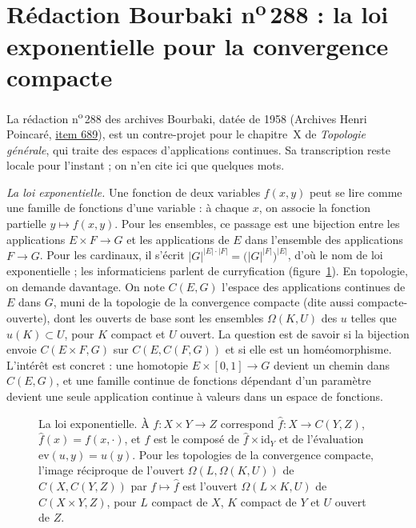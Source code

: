 \section[Rédaction Bourbaki n\textsuperscript{o}\,288 : la loi exponentielle]{Rédaction Bourbaki n\textsuperscript{o}\,288 : la loi exponentielle pour la convergence compacte\protect{}}\label{sec:bourbaki-288}

La rédaction n\textsuperscript{o}\,288 des archives Bourbaki, datée de 1958 (Archives Henri Poincaré, \href{https://archives-bourbaki.ahp-numerique.fr/items/show/689}{item 689}), est un contre-projet pour le chapitre~X de \emph{Topologie générale}, qui traite des espaces d'applications continues. Sa transcription reste locale pour l'instant ; on n'en cite ici que quelques mots.

\emph{La loi exponentielle.} Une fonction de deux variables $f(x, y)$ peut se lire comme une famille de fonctions d'une variable : à chaque $x$, on associe la fonction partielle $y \mapsto f(x, y)$. Pour les ensembles, ce passage est une bijection entre les applications $E \times F \to G$ et les applications de $E$ dans l'ensemble des applications $F \to G$. Pour les cardinaux, il s'écrit $|G|^{|E|\cdot|F|} = \bigl(|G|^{|F|}\bigr)^{|E|}$, d'où le nom de loi exponentielle ; les informaticiens parlent de curryfication (figure~\ref{fig:bourbaki-288}). En topologie, on demande davantage. On note $C(E, G)$ l'espace des applications continues de $E$ dans $G$, muni de la topologie de la convergence compacte (dite aussi compacte-ouverte), dont les ouverts de base sont les ensembles $\Omega(K, U)$ des $u$ telles que $u(K) \subset U$, pour $K$ compact et $U$ ouvert. La question est de savoir si la bijection envoie $C(E \times F, G)$ sur $C(E, C(F, G))$ et si elle est un homéomorphisme. L'intérêt est concret : une homotopie $E \times [0, 1] \to G$ devient un chemin dans $C(E, G)$, et une famille continue de fonctions dépendant d'un paramètre devient une seule application continue à valeurs dans un espace de fonctions.

\begin{figure}[htbp]
\centering
{}
\caption{La loi exponentielle. À $f : X \times Y \to Z$ correspond $\hat f : X \to C(Y, Z)$, $\hat f(x) = f(x, \cdot)$, et $f$ est le composé de $\hat f \times \mathrm{id}_Y$ et de l'évaluation $\mathrm{ev}(u, y) = u(y)$. Pour les topologies de la convergence compacte, l'image réciproque de l'ouvert $\Omega(L, \Omega(K, U))$ de $C(X, C(Y, Z))$ par $f \mapsto \hat f$ est l'ouvert $\Omega(L \times K, U)$ de $C(X \times Y, Z)$, pour $L$ compact de $X$, $K$ compact de $Y$ et $U$ ouvert de $Z$.}
\label{fig:bourbaki-288}
\end{figure}


